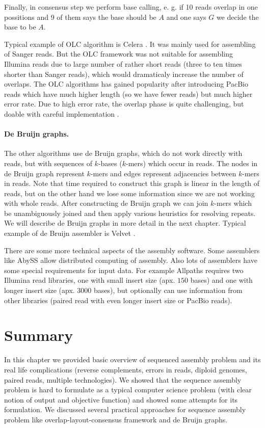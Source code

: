 Finally, in consensus step we perform base calling, e. g. if 10 reads overlap in
one possitions and 9 of them says the base should be $A$ and one says $G$ we decide the base to
be $A$.

Typical example of OLC algorithm is Celera \citep{Celera}.
It was mainly used for assembling of Sanger reads. But the OLC
framework was not suitable for assembling Illumina reads due to large number
of rather short reads (three to ten times shorter than Sanger reads), which
would dramaticaly increase the number of overlaps. 
The OLC algorithms has gained popularity after introducing PacBio reads
which have much higher length (so we have fewer reads) but much higher error rate.
Due to high error rate, the overlap phase is quite challenging, but
doable with careful implementation \citep{myers2014efficient}. 

\paragraph{De Bruijn graphs.}
The other algorithms use de Bruijn graphs, which do not work directly with reads, but
with sequences of $k$-bases ($k$-mers) which occur in reads. The nodes in de Bruijn graph represent $k$-mers
and edges represent adjacencies between $k$-mers in reads. Note that time
required to construct this graph is linear in the length of reads, but on the other hand
we lose some information since we are not working with whole reads.
After constructing de Bruijn graph we can join $k$-mers which be
unambiguously joined and then apply various heuristics for resolving repeats.
We will describe de Bruijn graphs in more detail in the next chapter.
Typical example of de Bruijn assembler is Velvet \citep{Velvet}.

\bigskip

There are some more technical aspects of the assembly software.
Some assemblers like AbySS \citep{Abyss} allow distributed computing
of assembly. Also lots of assemblers
have some special requirements for input data. For example
Allpaths \citep{allpaths} requires two Illumina read libraries, one
with small insert size (apx. $150$ bases) and one with longer insert
size (apx. $3000$ bases), but optionally can use information from other libraries
(paired read with even longer insert size or PacBio reads).

\section{Summary}

In this chapter we provided basic overview of sequenced assembly problem
and its real life complications (reverse complements, errors in reads,
diploid genomes, paired reads, multiple technologies). 
We showed that the sequence assembly problem is hard to formulate
as a typical computer science problem (with clear notion of output and objective function)
and showed some attempts for its formulation.
We discussed several practical approaches for sequence assembly problem like
overlap-layout-consensus framework and de Bruijn graphs.
